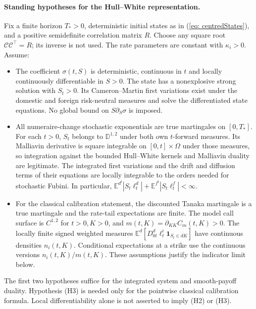 \paragraph{Standing hypotheses for the Hull--White representation.}\label{hyp: representation}
Fix a finite horizon $T_*>0$, deterministic initial states as in
(\ref{eq: centredStates}), and a positive semidefinite correlation matrix $R$.
Choose any square root $\mathcal C\mathcal C^\top=R$; its inverse is not used.
The rate parameters are constant with $\kappa_i>0$. Assume:
\begin{itemize}
\item[(H1)] The coefficient $\sigma(t,S)$ is deterministic, continuous in $t$
and locally continuously differentiable in $S>0$. The state has a nonexplosive
strong solution with $S_t>0$. Its Cameron--Martin first variations exist under
the domestic and foreign risk-neutral measures and solve the differentiated
state equations. No global bound on $S\partial_S\sigma$ is imposed.
\item[(H2)] All numeraire-change stochastic exponentials are true martingales
on $[0,T_*]$. For each $t>0$, $S_t$ belongs to $\mathbb D^{1,2}$ under both
own $t$-forward measures. Its Malliavin derivative is square integrable on
$[0,t]\times\Omega$ under those measures, so integration against the bounded
Hull--White kernels and Malliavin duality are legitimate. The integrated
first variations and the drift and diffusion terms of their equations are
locally integrable to the orders needed for stochastic Fubini. In particular,
$\mathbb E^{d^t}|S_t\ell^d_t|+
\mathbb E^{f^t}|S_t\ell^f_t|<\infty$.
\item[(H3)] For the classical calibration statement, the discounted Tanaka
martingale is a true martingale and the rate-tail expectations are finite.
The model call surface is $C^{1,2}$ for $t>0,K>0$, and
$m(t,K)=\partial_{KK}C_m(t,K)>0$. The locally finite signed weighted measures
$\mathbb E^d[D^d_{0t}\ell^i_t\mathbf1_{S_t\in dK}]$ have continuous densities
$n_i(t,K)$. Conditional expectations at a strike use the continuous versions
$n_i(t,K)/m(t,K)$. These assumptions justify the indicator limit below.
\end{itemize}
The first two hypotheses suffice for the integrated system and smooth-payoff
duality. Hypothesis (H3) is needed only for the pointwise classical calibration
formula. Local differentiability alone is not asserted to imply (H2) or (H3).

